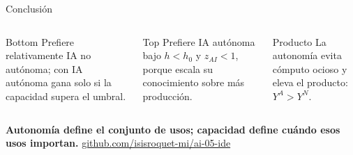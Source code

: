 \documentclass[aspectratio=169,11pt]{beamer}
\newcommand{\repo}{\href{https://github.com/isisroquet-mi/ai-05-ide}{github.com/isisroquet-mi/ai-05-ide}}
\begin{document}
\begin{frame}{Conclusi\'on}
\begin{columns}[T,onlytextwidth]
\begin{block}{Bottom}
Prefiere relativamente IA no aut\'onoma; con IA aut\'onoma gana solo si la capacidad supera el umbral.
\end{block}
\begin{block}{Top}
Prefiere IA aut\'onoma bajo $h<h_0$ y $z_{AI}<1$, porque escala su conocimiento sobre m\'as producci\'on.
\end{block}
\begin{block}{Producto}
La autonom\'ia evita c\'omputo ocioso y eleva el producto: $Y^A>Y^N$.
\end{block}
\end{columns}
\vspace{0.38cm}
\centering
{\Large\color{Noche}\textbf{Autonom\'ia define el conjunto de usos; capacidad define cu\'ando esos usos importan.}}
\vspace{0.28cm}
{\small\color{Petroleo}\repo}
\end{frame}
\end{document}

